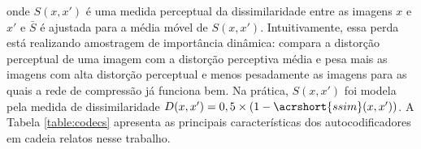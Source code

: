 onde $S(x, x')$ é uma medida perceptual da dissimilaridade entre as imagens $x$ e $x'$ e  $\bar{S}$ é ajustada para a média móvel de $S(x,x')$. 
Intuitivamente, essa perda está realizando amostragem de importância dinâmica: compara a distorção perceptual de uma imagem com a distorção perceptiva média e pesa mais as imagens com alta distorção perceptual e menos pesadamente as imagens para as quais a rede de compressão já funciona bem.
Na prática, $S(x, x')$ foi modela pela medida de dissimilaridade $D(x, x') = 0,5 \times (1- \acrshort{ssim} (x, x'))$. 
A Tabela \ref{table:codecs} apresenta as principais características dos autocodificadores em cadeia relatos nesse trabalho.  



